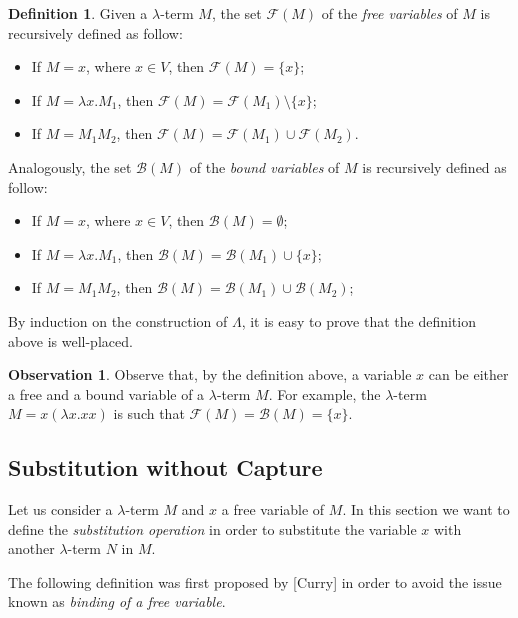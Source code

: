\documentclass[a4paper,11pt]{article}
\theoremstyle{definition}
\newtheorem{defn}{Definition}
\newtheorem{oss}{Observation}
\newcommand{\FF}{\mathcal{F}}
\newcommand{\BB}{\mathcal{B}}
\begin{document}
\begin{defn}
  Given a $\lambda$-term $M$, the set $\FF(M)$ of the \textit{free variables}
  of $M$ is recursively defined as follow:
  \begin{itemize}
    \item If $M=x$, where $x\in V$, then $\FF(M)=\{x\}$;
    \item If $M=\lambda x.M_1$, then $\FF(M)=\FF(M_1)\setminus\{x\}$;
    \item If $M=M_1M_2$, then $\FF(M)=\FF(M_1)\cup\FF(M_2)$.
  \end{itemize}
  Analogously, the set $\BB(M)$ of the \textit{bound variables} of $M$
  is recursively defined as follow:
  \begin{itemize}
    \item If $M=x$, where $x\in V$, then $\BB(M)=\emptyset$;
    \item If $M=\lambda x.M_1$, then $\BB(M) = \BB(M_1)\cup \{x\}$;
    \item If $M=M_1M_2$, then $\BB(M)=\BB(M_1)\cup\BB(M_2)$;
  \end{itemize}
\end{defn}
By induction on the construction of $\Lambda$, it is easy to prove that
the definition above is well-placed.

\begin{oss}
  Observe that, by the definition above, a variable $x$ can be either a free and 
  a bound variable of a $\lambda$-term $M$. For example, the 
  $\lambda$-term $M=x(\lambda x.xx)$ is such that $\FF(M) = \BB(M) = \{x\}$.
\end{oss}

\subsection{Substitution without Capture}
Let us consider a $\lambda$-term $M$ and $x$ a free variable of $M$. In this
section we want to define the \textit{substitution operation} in order to
substitute the variable $x$ with another $\lambda$-term $N$ in $M$.

The following definition was first proposed by [Curry] in order to avoid the
issue known as \textit{binding of a free variable}.
\end{document}
